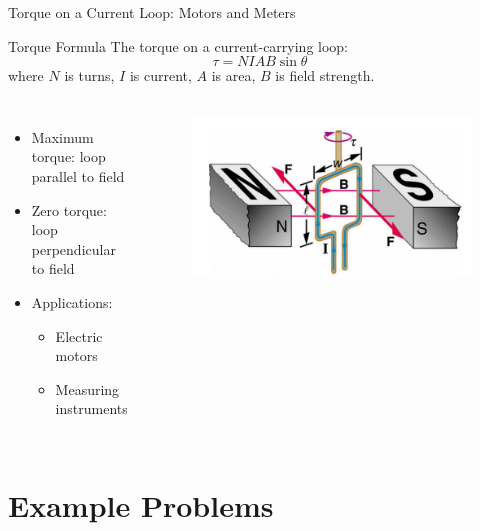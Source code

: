 \documentclass{beamer}
\begin{document}
\begin{frame}{Torque on a Current Loop: Motors and Meters}
\begin{block}{Torque Formula}
The torque on a current-carrying loop:
\begin{equation}
\tau = NIAB\sin\theta
\end{equation}
where $N$ is turns, $I$ is current, $A$ is area, $B$ is field strength.
\end{block}

\begin{columns}
\begin{itemize}
\item Maximum torque: loop parallel to field
\item Zero torque: loop perpendicular to field
\item Applications:
\begin{itemize}
\item Electric motors
\item Measuring instruments
\end{itemize}
\end{itemize}

\begin{figure}
\centering
\includegraphics[width=0.9\linewidth]{mgtrq.png}
\end{figure}
\end{columns}
\end{frame}

\section{Example Problems}
\end{document}
